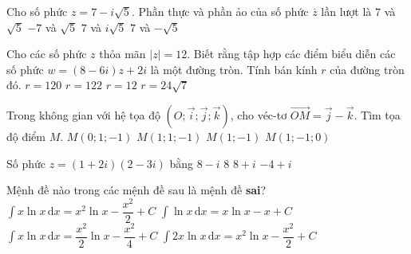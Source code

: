 \begin{ex}%
	Cho số phức $z=7-i\sqrt{5}$. Phần thực và phần ảo của số phức $\overline{z}$ lần lượt là
	\choice
	{\True $7$ và $\sqrt{5}$}
	{$-7$ và $\sqrt{5}$}
	{$7$ và $i\sqrt{5}$}
	{$7$ và $-\sqrt{5}$}
\end{ex}
\begin{ex}%
	Cho các số phức $z$ thỏa mãn $|z|=12$. Biết rằng tập hợp các điểm biểu diễn các số phức $w=(8-6i)z+2i$ là một đường tròn. Tính bán kính $r$ của đường tròn đó. 
	\choice
	{\True $r=120$}
	{$r=122$}
	{$r=12$}
	{$r=24\sqrt{7}$}
\end{ex}
\begin{ex}%
	Trong không gian với hệ tọa độ $\left(O;\overrightarrow{i};\overrightarrow{j};\overrightarrow{k}\right)$, cho véc-tơ $\overrightarrow{OM}=\overrightarrow{j}-\overrightarrow{k}$. Tìm tọa độ điểm $M$. 
	\choice
	{\True $M(0;1;-1)$}
	{$M(1;1;-1)$}
	{$M(1;-1)$}
	{$M(1;-1;0)$}
\end{ex}
\begin{ex}%
	Số phức $z=(1+2i)(2-3i)$ bằng
	\choice
	{$8-i$}
	{$8$}
	{\True $8+i$}
	{$-4+i$}
\end{ex}
\begin{ex}%
	Mệnh đề nào trong các mệnh đề sau là mệnh đề \textbf{sai}? 
	\choice
	{\True $\displaystyle\int x\ln x\mathrm{\,d}x=x^2\ln x-\dfrac{x^2}{2}+C$}
	{$\displaystyle\int\ln x\mathrm{\,d}x=x\ln x-x+C$}
	{$\displaystyle\int x\ln x\mathrm{\,d}x=\dfrac{x^2}{2}\ln x-\dfrac{x^2}{4}+C$}
	{$\displaystyle\int2x\ln x\mathrm{\,d}x=x^2\ln x-\dfrac{x^2}{2}+C$}
\end{ex}
